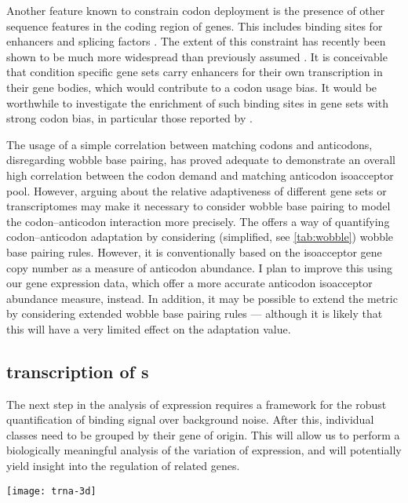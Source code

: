 Another feature known to constrain codon deployment is the presence of other
sequence features in the coding region of genes. This includes binding sites for
enhancers and splicing factors \citep{Hyder:1995,Blencowe:2000}. The extent of
this constraint has recently been shown to be much more widespread than
previously assumed \citep{Stergachis:2013}. It is conceivable that condition
specific gene sets carry enhancers for their own transcription in their gene
bodies, which would contribute to a codon usage bias. It would be worthwhile to
investigate the enrichment of such binding sites in gene sets with strong codon
bias, in particular those reported by \citep{Gingold:2014}.

The usage of a simple correlation between matching codons and anticodons,
disregarding wobble base pairing, has proved adequate to demonstrate an overall
high correlation between the codon demand and matching \trna anticodon
isoacceptor pool. However, arguing about the relative adaptiveness of different
gene sets or transcriptomes may make it  necessary to consider wobble base
pairing to model the codon--anticodon interaction more precisely. The \tai
\citep{Dos_Reis:2003} offers a way of quantifying codon--anticodon adaptation by
considering (simplified, see \cref{tab:wobble}) wobble base pairing rules.
However, it is conventionally based on the \trna isoacceptor gene copy number as
a measure of anticodon abundance. I plan to improve this using our \trna gene
expression data, which offer a more accurate anticodon isoacceptor abundance
measure, instead. In addition, it may be possible to extend the \tai metric by
considering extended wobble base pairing rules \citep{Murphy:2004} --- although
it is likely that this will have a very limited effect on the adaptation value.

\subsection{ transcription of s}

The next step in the analysis of \transsine expression requires a framework for
the robust quantification of  binding signal over background noise. After
this, individual \transsine classes need to be grouped by their \rna gene of
origin. This will allow us to perform a biologically meaningful analysis of
the variation of expression, and will potentially yield insight into the
regulation of related \trna genes.

\clearpage

\begin{center}
    \vspace*{\fill}
    \texttt{[image: trna-3d]}
    \vspace*{\fill}
\end{center}
